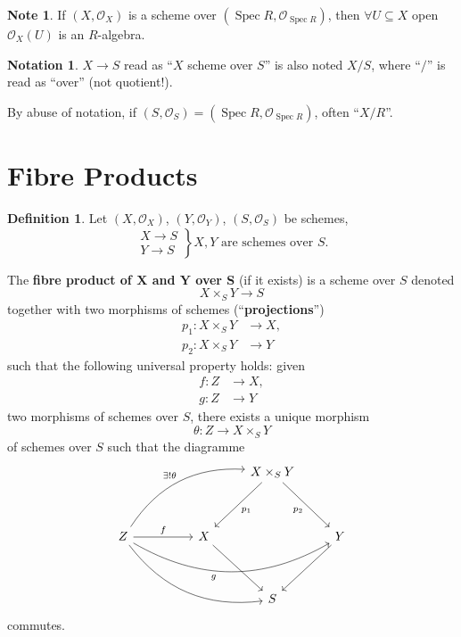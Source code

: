 \documentclass[12pt]{article}
\DeclareMathOperator{\Spec}{Spec}
\theoremstyle{definition}
\newtheorem*{definition}{Definition}
\newtheorem*{notation}{Notation}
\newtheorem*{note}{Note}
\theoremstyle{remark}
\begin{document}
\begin{note}
If $(X,\mathcal{O}_X)$ is a scheme over $(\Spec R,\mathcal{O}_{\Spec R})$, then $\forall U\subseteq X$ open $\mathcal{O}_X(U)$ is an $R$-algebra.
\end{note}

\begin{notation}
$X\rightarrow S$ read as ``$X$ scheme over $S$'' is also noted $X/S$, where ``$/$'' is read as ``over'' (not quotient!).

By abuse of notation, if $(S,\mathcal{O}_S)=(\Spec R,\mathcal{O}_{\Spec R})$, often ``$X/R$''.
\end{notation}

\section{Fibre Products}

\begin{definition}
Let $(X,\mathcal{O}_X)$, $(Y,\mathcal{O}_Y)$, $(S,\mathcal{O}_S)$ be schemes,
\[\left.\begin{array}{l}X\rightarrow S\\Y\rightarrow S\end{array}\right\}X,Y\text{ are schemes over }S.\]

The \textbf{fibre product of $\boldsymbol{X}$ and $\boldsymbol{Y}$ over S} (if it exists) is a scheme over $S$ denoted
\[X\times_SY\longrightarrow S\]
together with two morphisms of schemes (``\textbf{projections}'')
\begin{align*}
p_1:X\times_SY&\longrightarrow X,\\
p_2:X\times_SY&\longrightarrow Y
\end{align*}
such that the following universal property holds: given
\begin{align*}
f:Z&\longrightarrow X,\\
g:Z&\longrightarrow Y
\end{align*}
two morphisms of schemes over $S$, there exists a unique morphism
\[\theta:Z\longrightarrow X\times_SY\]
of schemes over $S$ such that the diagramme
\[
\begin{tikzcd}
&&&X\times_SY\arrow[ddl,"p_1"]\arrow[ddr,"p_2",swap]\\\\
Z\arrow[rr,"f"]\arrow[rrruu,bend left,"\exists!\theta"]\arrow[rrrr,bend right,"g\hspace{10mm}",swap]\arrow[rrrdd,bend right]&&X\arrow[rdd]&&Y\arrow[ldd]\\\\
&&&S
\end{tikzcd}
\]
commutes.
\end{definition}
\end{document}
